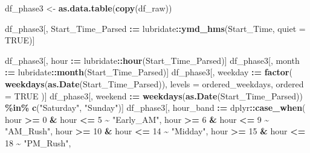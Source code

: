 \documentclass[
]{article}
\newenvironment{Shaded}{\begin{snugshade}}{\end{snugshade}}
\newcommand{\AttributeTok}[1]{\textcolor[rgb]{0.13,0.29,0.53}{#1}}
\newcommand{\ConstantTok}[1]{\textcolor[rgb]{0.56,0.35,0.01}{#1}}
\newcommand{\DecValTok}[1]{\textcolor[rgb]{0.00,0.00,0.81}{#1}}
\newcommand{\FunctionTok}[1]{\textcolor[rgb]{0.13,0.29,0.53}{\textbf{#1}}}
\newcommand{\NormalTok}[1]{#1}
\newcommand{\OtherTok}[1]{\textcolor[rgb]{0.56,0.35,0.01}{#1}}
\newcommand{\SpecialCharTok}[1]{\textcolor[rgb]{0.81,0.36,0.00}{\textbf{#1}}}
\newcommand{\StringTok}[1]{\textcolor[rgb]{0.31,0.60,0.02}{#1}}
\begin{document}
\begin{Shaded}
\begin{Highlighting}[]
\NormalTok{df\_phase3 }\OtherTok{\textless{}{-}} \FunctionTok{as.data.table}\NormalTok{(}\FunctionTok{copy}\NormalTok{(df\_raw))}
\end{Highlighting}
\end{Shaded}

\begin{Shaded}
\begin{Highlighting}[]
\NormalTok{df\_phase3[, Start\_Time\_Parsed }\SpecialCharTok{:=}\NormalTok{ lubridate}\SpecialCharTok{::}\FunctionTok{ymd\_hms}\NormalTok{(Start\_Time, }\AttributeTok{quiet =} \ConstantTok{TRUE}\NormalTok{)]}

\NormalTok{df\_phase3[, hour }\SpecialCharTok{:=}\NormalTok{ lubridate}\SpecialCharTok{::}\FunctionTok{hour}\NormalTok{(Start\_Time\_Parsed)]}
\NormalTok{df\_phase3[, month }\SpecialCharTok{:=}\NormalTok{ lubridate}\SpecialCharTok{::}\FunctionTok{month}\NormalTok{(Start\_Time\_Parsed)]}
\NormalTok{df\_phase3[, weekday }\SpecialCharTok{:=} \FunctionTok{factor}\NormalTok{(}
  \FunctionTok{weekdays}\NormalTok{(}\FunctionTok{as.Date}\NormalTok{(Start\_Time\_Parsed)),}
  \AttributeTok{levels =}\NormalTok{ ordered\_weekdays,}
  \AttributeTok{ordered =} \ConstantTok{TRUE}
\NormalTok{)]}
\NormalTok{df\_phase3[, weekend }\SpecialCharTok{:=} \FunctionTok{weekdays}\NormalTok{(}\FunctionTok{as.Date}\NormalTok{(Start\_Time\_Parsed)) }\SpecialCharTok{\%in\%} \FunctionTok{c}\NormalTok{(}\StringTok{"Saturday"}\NormalTok{, }\StringTok{"Sunday"}\NormalTok{)]}
\NormalTok{df\_phase3[, hour\_band }\SpecialCharTok{:=}\NormalTok{ dplyr}\SpecialCharTok{::}\FunctionTok{case\_when}\NormalTok{(}
\NormalTok{  hour }\SpecialCharTok{\textgreater{}=} \DecValTok{0} \SpecialCharTok{\&}\NormalTok{ hour }\SpecialCharTok{\textless{}=} \DecValTok{5} \SpecialCharTok{\textasciitilde{}} \StringTok{"Early\_AM"}\NormalTok{,}
\NormalTok{  hour }\SpecialCharTok{\textgreater{}=} \DecValTok{6} \SpecialCharTok{\&}\NormalTok{ hour }\SpecialCharTok{\textless{}=} \DecValTok{9} \SpecialCharTok{\textasciitilde{}} \StringTok{"AM\_Rush"}\NormalTok{,}
\NormalTok{  hour }\SpecialCharTok{\textgreater{}=} \DecValTok{10} \SpecialCharTok{\&}\NormalTok{ hour }\SpecialCharTok{\textless{}=} \DecValTok{14} \SpecialCharTok{\textasciitilde{}} \StringTok{"Midday"}\NormalTok{,}
\NormalTok{  hour }\SpecialCharTok{\textgreater{}=} \DecValTok{15} \SpecialCharTok{\&}\NormalTok{ hour }\SpecialCharTok{\textless{}=} \DecValTok{18} \SpecialCharTok{\textasciitilde{}} \StringTok{"PM\_Rush"}\NormalTok{,}

\end{Highlighting}
\end{Shaded}
\end{document}
